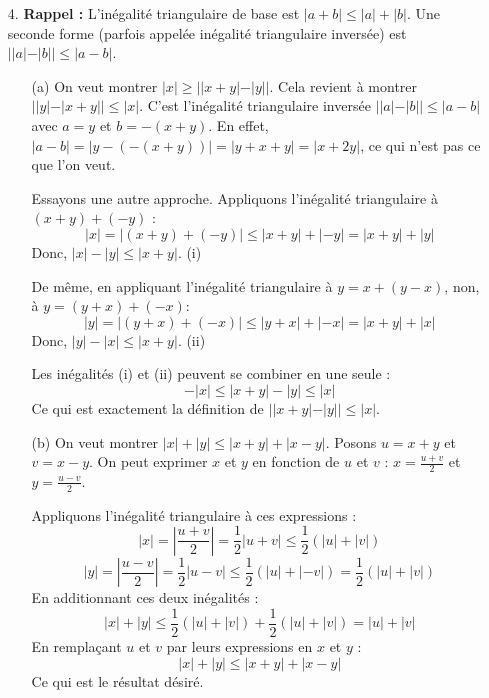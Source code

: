 \documentclass[solutions]{exercices}
\begin{document}
\begin{solution}
\begin{enumerate}
		\item[4.] \textbf{Rappel :} L'inégalité triangulaire de base est $|a+b| \leq |a|+|b|$. Une seconde forme (parfois appelée inégalité triangulaire inversée) est $||a|-|b|| \leq |a-b|$.
		      \begin{enumerate}
			      \item[(a)] On veut montrer $|x| \geq ||x+y| - |y||$. Cela revient à montrer $||y| - |x+y|| \leq |x|$.
			            C'est l'inégalité triangulaire inversée $||a|-|b|| \leq |a-b|$ avec $a=y$ et $b=-(x+y)$.
			            En effet, $|a-b| = |y - (-(x+y))| = |y+x+y| = |x+2y|$, ce qui n'est pas ce que l'on veut.

			            Essayons une autre approche. Appliquons l'inégalité triangulaire à $(x+y) + (-y)$ :
			            \[ |x| = |(x+y) + (-y)| \leq |x+y| + |-y| = |x+y| + |y| \]
			            Donc, $|x| - |y| \leq |x+y|$. (i)

			            De même, en appliquant l'inégalité triangulaire à $y = x + (y-x)$, non, à $y = (y+x)+(-x)$:
			            \[ |y| = |(y+x) + (-x)| \leq |y+x| + |-x| = |x+y| + |x| \]
			            Donc, $|y| - |x| \leq |x+y|$. (ii)

			            Les inégalités (i) et (ii) peuvent se combiner en une seule :
			            \[ -|x| \leq |x+y| - |y| \leq |x| \]
			            Ce qui est exactement la définition de $||x+y| - |y|| \leq |x|$.
			      \item[(b)] On veut montrer $|x| + |y| \leq |x+y| + |x-y|$.
			            Posons $u = x+y$ et $v = x-y$. On peut exprimer $x$ et $y$ en fonction de $u$ et $v$ :
			            $x = \frac{u+v}{2}$ et $y = \frac{u-v}{2}$.

			            Appliquons l'inégalité triangulaire à ces expressions :
			            \[ |x| = \left|\frac{u+v}{2}\right| = \frac{1}{2}|u+v| \leq \frac{1}{2}(|u|+|v|) \]
			            \[ |y| = \left|\frac{u-v}{2}\right| = \frac{1}{2}|u-v| \leq \frac{1}{2}(|u|+|-v|) = \frac{1}{2}(|u|+|v|) \]
			            En additionnant ces deux inégalités :
			            \[ |x| + |y| \leq \frac{1}{2}(|u|+|v|) + \frac{1}{2}(|u|+|v|) = |u|+|v| \]
			            En remplaçant $u$ et $v$ par leurs expressions en $x$ et $y$ :
			            \[ |x|+|y| \leq |x+y| + |x-y| \]
			            Ce qui est le résultat désiré.
		      \end{enumerate}
	\end{enumerate}
\end{solution}
\end{document}
